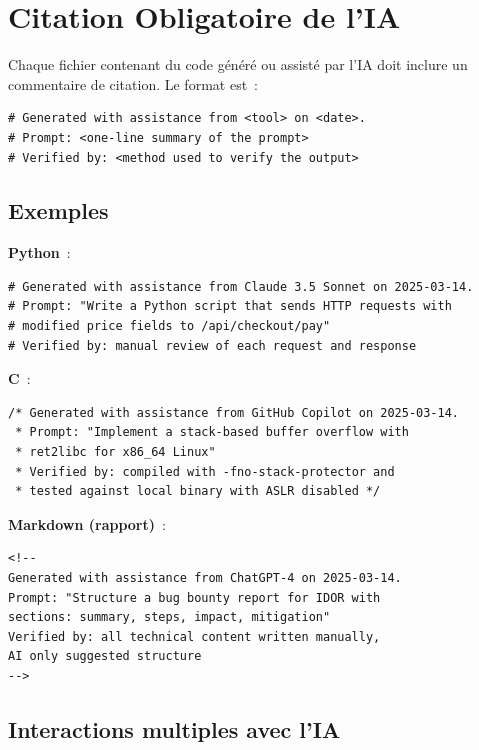 
\section{Citation Obligatoire de l'IA}
\label{sec:ai-citation}

Chaque fichier contenant du code généré ou assisté par l'IA doit
inclure un commentaire de citation. Le format est~:

\begin{verbatim}
# Generated with assistance from <tool> on <date>.
# Prompt: <one-line summary of the prompt>
# Verified by: <method used to verify the output>
\end{verbatim}

\subsection*{Exemples}

\textbf{Python}~:
\begin{verbatim}
# Generated with assistance from Claude 3.5 Sonnet on 2025-03-14.
# Prompt: "Write a Python script that sends HTTP requests with
# modified price fields to /api/checkout/pay"
# Verified by: manual review of each request and response
\end{verbatim}

\textbf{C}~:
\begin{verbatim}
/* Generated with assistance from GitHub Copilot on 2025-03-14.
 * Prompt: "Implement a stack-based buffer overflow with
 * ret2libc for x86_64 Linux"
 * Verified by: compiled with -fno-stack-protector and
 * tested against local binary with ASLR disabled */
\end{verbatim}

\textbf{Markdown (rapport)}~:
\begin{verbatim}
<!--
Generated with assistance from ChatGPT-4 on 2025-03-14.
Prompt: "Structure a bug bounty report for IDOR with
sections: summary, steps, impact, mitigation"
Verified by: all technical content written manually,
AI only suggested structure
-->
\end{verbatim}

\subsection*{Interactions multiples avec l'IA}

